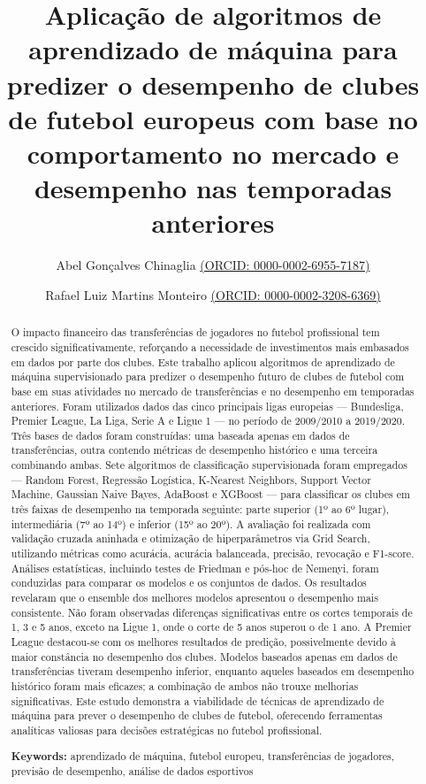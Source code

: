 \documentclass[a4paper]{article}
\title{Aplicação de algoritmos de aprendizado de máquina para predizer o desempenho de clubes de futebol europeus com base no comportamento no mercado e desempenho nas temporadas anteriores}
\author[1,2]{Abel Gonçalves Chinaglia \href{https://orcid.org/0000-0002-6955-7187}{(ORCID: 0000-0002-6955-7187)}}
\author[1,2]{Rafael Luiz Martins Monteiro \href{https://orcid.org/0000-0002-3208-6369}{(ORCID: 0000-0002-3208-6369)}}
\affil[1]{Faculdade de Medicina de Ribeirão Preto, Universidade de São Paulo, Brasil}
\affil[2]{Escola de Educação Física e Esportes de Ribeirão Preto, Universidade de São Paulo, Brasil}
\date{} %
\theoremstyle{plain}
\theoremstyle{definition}
\begin{document}
\maketitle
	
\begin{abstract}
O impacto financeiro das transferências de jogadores no futebol profissional tem crescido significativamente, reforçando a necessidade de investimentos mais embasados em dados por parte dos clubes. Este trabalho aplicou algoritmos de aprendizado de máquina supervisionado para predizer o desempenho futuro de clubes de futebol com base em suas atividades no mercado de transferências e no desempenho em temporadas anteriores. Foram utilizados dados das cinco principais ligas europeias --- Bundesliga, Premier League, La Liga, Serie A e Ligue 1 --- no período de 2009/2010 a 2019/2020. Três bases de dados foram construídas: uma baseada apenas em dados de transferências, outra contendo métricas de desempenho histórico e uma terceira combinando ambas. Sete algoritmos de classificação supervisionada foram empregados --- Random Forest, Regressão Logística, K-Nearest Neighbors, Support Vector Machine, Gaussian Naive Bayes, AdaBoost e XGBoost --- para classificar os clubes em três faixas de desempenho na temporada seguinte: parte superior (1º ao 6º lugar), intermediária (7º ao 14º) e inferior (15º ao 20º). A avaliação foi realizada com validação cruzada aninhada e otimização de hiperparâmetros via Grid Search, utilizando métricas como acurácia, acurácia balanceada, precisão, revocação e F1-score. Análises estatísticas, incluindo testes de Friedman e pós-hoc de Nemenyi, foram conduzidas para comparar os modelos e os conjuntos de dados. Os resultados revelaram que o ensemble dos melhores modelos apresentou o desempenho mais consistente. Não foram observadas diferenças significativas entre os cortes temporais de 1, 3 e 5 anos, exceto na Ligue 1, onde o corte de 5 anos superou o de 1 ano. A Premier League destacou-se com os melhores resultados de predição, possivelmente devido à maior constância no desempenho dos clubes. Modelos baseados apenas em dados de transferências tiveram desempenho inferior, enquanto aqueles baseados em desempenho histórico foram mais eficazes; a combinação de ambos não trouxe melhorias significativas. Este estudo demonstra a viabilidade de técnicas de aprendizado de máquina para prever o desempenho de clubes de futebol, oferecendo ferramentas analíticas valiosas para decisões estratégicas no futebol profissional.


\noindent\textbf{Keywords:} aprendizado de máquina, futebol europeu, transferências de jogadores, previsão de desempenho, análise de dados esportivos
\newline

\end{abstract}
\end{document}
